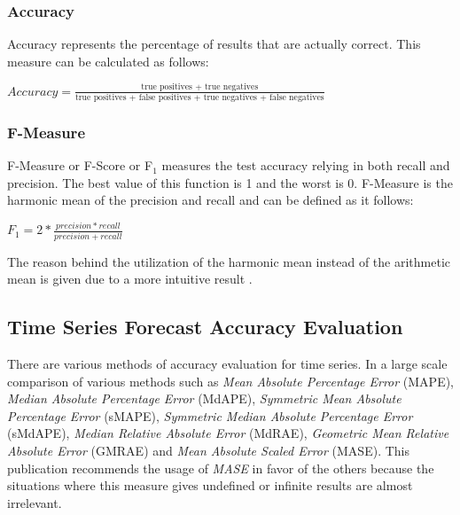 \subsubsection{Accuracy}

Accuracy represents the percentage of results that are actually correct. This
measure can be calculated as follows:

\begin{center} \Large \begin{math} Accuracy = \frac{\text{true positives + true
negatives}}{\text{true positives + false positives + true negatives + false
negatives}} \end{math} \normalsize \end{center}


\subsubsection{F-Measure}

F-Measure or F-Score or F\begin{math}_1 \end{math} measures the test accuracy
  relying in both recall and precision. The best value of this function is 1 and
  the worst is 0. F-Measure is the harmonic mean of the precision and recall and
  can be defined as it follows:

\begin{center} \Large \begin{math} F_1 = 2 *
\frac{precision*recall}{precision+recall} \end{math} \normalsize \end{center}

The reason behind the utilization of the harmonic mean instead of the arithmetic
mean is given due to a more intuitive result \cite{sasaki2007truth}. \\

\subsection{Time Series Forecast Accuracy Evaluation}

There are various methods of accuracy evaluation for time series. In
\cite{Hyndman2006679} a large scale comparison of various methods such as
\emph{Mean Absolute Percentage Error} (MAPE), \emph{Median Absolute Percentage
Error} (MdAPE), \emph{Symmetric Mean Absolute Percentage Error} (sMAPE),
\emph{Symmetric Median Absolute Percentage Error} (sMdAPE), \emph{Median
Relative Absolute Error} (MdRAE), \emph{Geometric Mean Relative Absolute
Error} (GMRAE) and \emph{Mean Absolute Scaled Error} (MASE). This publication
recommends the usage of \emph{MASE} in favor of the others because the
situations where this measure gives undefined or infinite results are almost
irrelevant.

